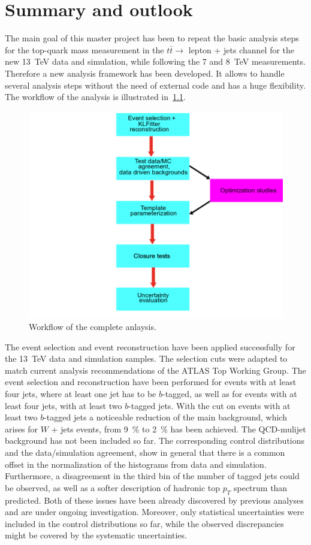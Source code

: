 \chapter{Summary and outlook}
\label{sec:sum}

The main goal of this master project has been to repeat the basic analysis steps for the top-quark mass measurement in the $t\bar{t} \rightarrow $ lepton + jets channel for the new 13~TeV data and simulation, while following the  7 and 8~TeV measurements. Therefore a new analysis framework has been developed. It allows to handle several analysis steps without the need of external code and has a huge flexibility. The workflow of the analysis is illustrated in~\cref{fig:Workflow}.

\begin{figure}
	\center
	\includegraphics[width=0.6\linewidth]{Pics/Workflow}
	\caption{Workflow of the complete anlaysis.} \label{fig:Workflow}
\end{figure}

 The event selection and event reconstruction have been applied successfully for the 13~TeV data and simulation samples. The selection cuts were adapted to match current analysis recommendations of the ATLAS Top Working Group. The event selection and reconstruction have been performed for events with at least four jets, where at least one jet has to be $b$-tagged, as well as for events with at least four jets, with  at least two $b$-tagged jets.  With the cut on events with at least two $b$-tagged jets a noticeable reduction of the main background, which arises for $W$  + jets events, from 9~\% to 2~\% has been  achieved. The QCD-mulijet background has not been included so far. The corresponding control distributions and  the data/simulation agreement, show in general that there is a common offset in the normalization of the histograms from data and simulation. Furthermore, a disagreement  in the third bin of the number of tagged jets could be observed, as well as a softer description of hadronic top $p_T$ spectrum than predicted. Both of these issues have been already discovered by previous analyses and are under ongoing investigation. Moreover, only statistical uncertainties were included in the control distributions so far, while the observed discrepancies might be covered by the systematic uncertainties.
 

